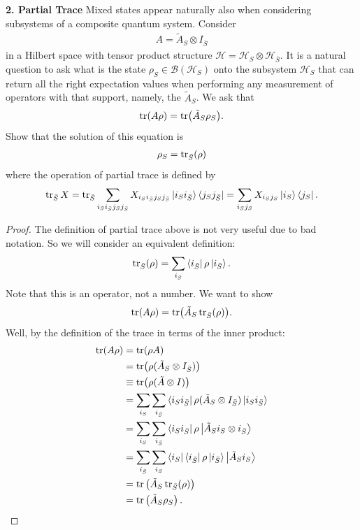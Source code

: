 \documentclass{book}
\theoremstyle{definition}
\newcommand{\nn}{\nonumber}
\newcommand{\had}{\mathcal{H}}
\newcommand{\lp}{\left(}
\newcommand{\rp}{\right)}
\begin{document}
\noindent \textbf{2. Partial Trace} Mixed states appear naturally also when considering subsystems of a composite
quantum system. Consider
\begin{align}
A = \tilde{A}_S \otimes I_{\bar{S}}
\end{align}
in a Hilbert space with tensor product structure $\had = \had_S \otimes \had_{\bar{S}}$. It is a natural question to ask what is the state $\rho_S \in \mathcal{B}(\had_S)$ onto the subsystem $\had_S$ that can return all the right expectation values when performing any measurement of operators with that support, namely, the $\tilde{A}_S$. We ask that 
\begin{align}
\tr(A\rho) = \tr(\tilde{A}_S \rho_S).
\end{align}
Show that the solution of this equation is 
\begin{align}
\rho_S = \tr_{\bar{S}}(\rho)
\end{align}
where the operation of partial trace is defined by
\begin{align}
\tr_{\bar{S}}X = \tr_{\bar{S}}\sum_{i_S i_{\bar{S}} j_S j_{\bar{S}}}  X_{i_S i_{\bar{S}} j_S j_{\bar{S}}} \ket{i_S i_{\bar{S}}}\bra{j_S j_{\bar{S}}} = \sum_{i_S  j_S} X_{i_S j_S} \ket{i_S}\bra{j_S}.
\end{align}


\begin{proof}     
	The definition of partial trace above is not very useful due to bad notation. So we will consider an equivalent definition:
	\begin{align}
	\tr_{\bar{S}}(\rho) = \sum_{i_{\bar{S}}} \bra{i_{\bar{S}}}\rho\ket{i_{\bar{S}}}. 
	\end{align}
	Note that this is an operator, not a number.  We want to show
	\begin{align}
	\tr(A\rho) = \tr(\tilde{A}_S \tr_{\bar{S}}(\rho)).
	\end{align}
	Well, by the definition of the trace in terms of the inner product:
	\begin{align}
	\tr(A\rho) &= \tr(\rho A) \nn\\
	&= \tr(\rho(\tilde{A}_S \otimes I_{\bar{S}}) )\nn\\
	&\equiv \tr(\rho (\tilde{A} \otimes I))\nn\\
	&=  \sum_{i_{S}} \sum_{i_{\bar{S}}}\bra{i_{S} i_{\bar{S}}} \rho (\tilde{A}_S \otimes I_{\bar{S}})   \ket{i_{S} i_{\bar{S}}}\nn\\
	&= \sum_{i_{S}} \sum_{i_{\bar{S}}}\bra{i_{S} i_{\bar{S}}} \rho \ket{\tilde{A}_S i_S \otimes  i_{\bar{S}}}\nn\\
	&= \sum_{i_{\bar{S}}}\sum_{i_{S}}  \bra{i_{{S}}}  \bra{i_{\bar{S}}} \rho \ket{i_{\bar{S}}}  \ket{\tilde{A}_S i_S} \nn\\
	&= \tr\lp \tilde{A}_S \tr_{\bar{S}} (\rho) \rp\nn\\
	&= \tr\lp \tilde{A}_S \rho_S \rp.
	\end{align}
	
\end{proof}
\end{document}
